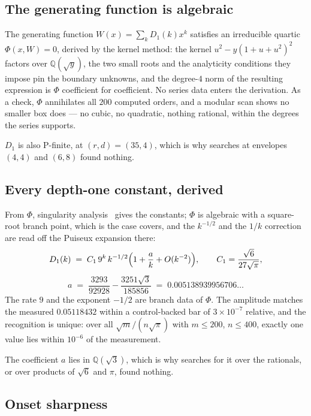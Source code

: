 \documentclass[11pt]{article}
\newcommand{\Q}{\mathbb{Q}}
\begin{document}
\subsection{The generating function is algebraic}

The generating function $W(x) = \sum_k D_1(k)x^k$ satisfies an irreducible
quartic $\Phi(x, W) = 0$, derived by the kernel method: the kernel
$u^2 - y(1+u+u^2)^2$ factors over $\Q(\sqrt y)$, the two small roots and the
analyticity conditions they impose pin the boundary unknowns, and the degree-$4$
norm of the resulting expression is $\Phi$ coefficient for coefficient. No series
data enters the derivation. As a check, $\Phi$ annihilates all $200$ computed
orders, and a modular scan shows no smaller box does --- no cubic, no quadratic,
nothing rational, within the degrees the series supports.

$D_1$ is also P-finite, at $(r,d) = (35,4)$, which is why searches at
envelopes $(4,4)$ and $(6,8)$ found nothing.

\subsection{Every depth-one constant, derived}

From $\Phi$, singularity analysis~\cite[Ch.~VI--VII]{flajoletSedgewick2009}
gives the constants; $\Phi$ is algebraic
with a square-root branch point, which is the case
\cite[Thm.~VII.8]{flajoletSedgewick2009} covers, and the $k^{-1/2}$ and the
$1/k$ correction are read off the Puiseux expansion there:
\[
  D_1(k) \;=\; C_1\,9^k\,k^{-1/2}\Bigl(1 + \frac{a}{k} + O(k^{-2})\Bigr),
  \qquad
  C_1 = \frac{\sqrt6}{27\sqrt\pi},
\]
\[
  a \;=\; \frac{3293}{92928} - \frac{3251\sqrt3}{185856}
    \;=\; 0.005138939956706\dots
\]
The rate $9$ and the exponent $-1/2$ are branch data of $\Phi$. The amplitude
matches the measured $0.05118432$ within a control-backed bar of $3\times10^{-7}$
relative, and the recognition is unique: over all $\sqrt m/(n\sqrt\pi)$ with
$m \le 200$, $n \le 400$, exactly one value lies within $10^{-6}$ of the
measurement.

The coefficient $a$ lies in $\Q(\sqrt3)$, which is why searches for it over
the rationals, or over products of $\sqrt6$ and $\pi$, found nothing.

\subsection{Onset sharpness}
\label{sec:sharp3}
\end{document}
